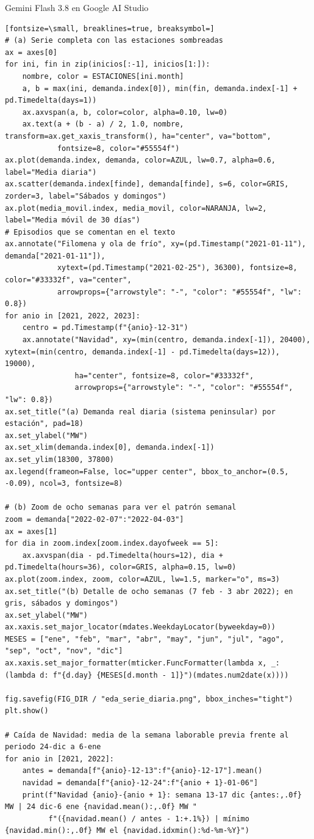 \documentclass[12pt,a4paper,oneside]{book}
\begin{document}
\begin{iaresp}{Gemini Flash 3.8 en Google AI Studio}
\begin{Verbatim}[fontsize=\small, breaklines=true, breaksymbol=]
# (a) Serie completa con las estaciones sombreadas
ax = axes[0]
for ini, fin in zip(inicios[:-1], inicios[1:]):
    nombre, color = ESTACIONES[ini.month]
    a, b = max(ini, demanda.index[0]), min(fin, demanda.index[-1] + pd.Timedelta(days=1))
    ax.axvspan(a, b, color=color, alpha=0.10, lw=0)
    ax.text(a + (b - a) / 2, 1.0, nombre, transform=ax.get_xaxis_transform(), ha="center", va="bottom",
            fontsize=8, color="#55554f")
ax.plot(demanda.index, demanda, color=AZUL, lw=0.7, alpha=0.6, label="Media diaria")
ax.scatter(demanda.index[finde], demanda[finde], s=6, color=GRIS, zorder=3, label="Sábados y domingos")
ax.plot(media_movil.index, media_movil, color=NARANJA, lw=2, label="Media móvil de 30 días")
# Episodios que se comentan en el texto
ax.annotate("Filomena y ola de frío", xy=(pd.Timestamp("2021-01-11"), demanda["2021-01-11"]),
            xytext=(pd.Timestamp("2021-02-25"), 36300), fontsize=8, color="#33332f", va="center",
            arrowprops={"arrowstyle": "-", "color": "#55554f", "lw": 0.8})
for anio in [2021, 2022, 2023]:
    centro = pd.Timestamp(f"{anio}-12-31")
    ax.annotate("Navidad", xy=(min(centro, demanda.index[-1]), 20400), xytext=(min(centro, demanda.index[-1] - pd.Timedelta(days=12)), 19000),
                ha="center", fontsize=8, color="#33332f",
                arrowprops={"arrowstyle": "-", "color": "#55554f", "lw": 0.8})
ax.set_title("(a) Demanda real diaria (sistema peninsular) por estación", pad=18)
ax.set_ylabel("MW")
ax.set_xlim(demanda.index[0], demanda.index[-1])
ax.set_ylim(18300, 37800)
ax.legend(frameon=False, loc="upper center", bbox_to_anchor=(0.5, -0.09), ncol=3, fontsize=8)

# (b) Zoom de ocho semanas para ver el patrón semanal
zoom = demanda["2022-02-07":"2022-04-03"]
ax = axes[1]
for dia in zoom.index[zoom.index.dayofweek == 5]:
    ax.axvspan(dia - pd.Timedelta(hours=12), dia + pd.Timedelta(hours=36), color=GRIS, alpha=0.15, lw=0)
ax.plot(zoom.index, zoom, color=AZUL, lw=1.5, marker="o", ms=3)
ax.set_title("(b) Detalle de ocho semanas (7 feb - 3 abr 2022); en gris, sábados y domingos")
ax.set_ylabel("MW")
ax.xaxis.set_major_locator(mdates.WeekdayLocator(byweekday=0))
MESES = ["ene", "feb", "mar", "abr", "may", "jun", "jul", "ago", "sep", "oct", "nov", "dic"]
ax.xaxis.set_major_formatter(mticker.FuncFormatter(lambda x, _: (lambda d: f"{d.day} {MESES[d.month - 1]}")(mdates.num2date(x))))

fig.savefig(FIG_DIR / "eda_serie_diaria.png", bbox_inches="tight")
plt.show()

# Caída de Navidad: media de la semana laborable previa frente al periodo 24-dic a 6-ene
for anio in [2021, 2022]:
    antes = demanda[f"{anio}-12-13":f"{anio}-12-17"].mean()
    navidad = demanda[f"{anio}-12-24":f"{anio + 1}-01-06"]
    print(f"Navidad {anio}-{anio + 1}: semana 13-17 dic {antes:,.0f} MW | 24 dic-6 ene {navidad.mean():,.0f} MW "
          f"({navidad.mean() / antes - 1:+.1%}) | mínimo {navidad.min():,.0f} MW el {navidad.idxmin():%d-%m-%Y}")
\end{Verbatim}
\end{iaresp}
\end{document}
